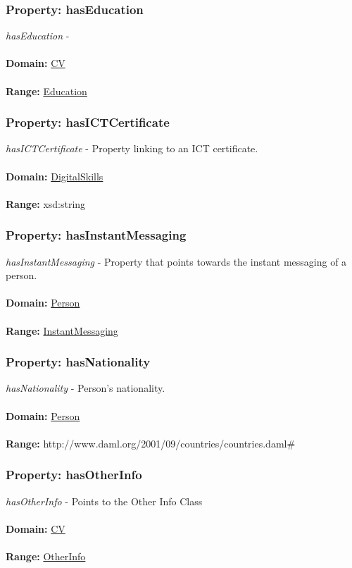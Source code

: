 \documentclass[a4paper,12pt]{article}
\numberwithin{equation}{section}
\begin{document}
\subsubsection{Property: hasEducation}\hypertarget{hasEducation}{}
\textit{hasEducation} - 
\\\\
\textbf{Domain:} \hyperlink{CV}{CV} 
\\\\
\textbf{Range:}  \hyperlink{Education}{Education} 

\subsubsection{Property: hasICTCertificate}\hypertarget{hasICTCertificate}{}
\textit{hasICTCertificate} - Property linking to an ICT certificate.
\\\\
\textbf{Domain:} \hyperlink{DigitalSkills}{DigitalSkills} 
\\\\
\textbf{Range:}  xsd:string

\subsubsection{Property: hasInstantMessaging}\hypertarget{hasInstantMessaging}{}
\textit{hasInstantMessaging} - Property that points towards the instant messaging of a person.
\\\\
\textbf{Domain:} \hyperlink{Person}{Person} 
\\\\
\textbf{Range:}  \hyperlink{InstantMessaging}{InstantMessaging} 

\subsubsection{Property: hasNationality}\hypertarget{hasNationality}{}
\textit{hasNationality} - Person's nationality.
\\\\
\textbf{Domain:} \hyperlink{Person}{Person} 
\\\\
\textbf{Range:}  http://www.daml.org/2001/09/countries/countries.daml\#

\subsubsection{Property: hasOtherInfo}\hypertarget{hasOtherInfo}{}
\textit{hasOtherInfo} - Points to the Other Info Class
\\\\
\textbf{Domain:} \hyperlink{CV}{CV} 
\\\\
\textbf{Range:}  \hyperlink{OtherInfo}{OtherInfo} 
\end{document}
